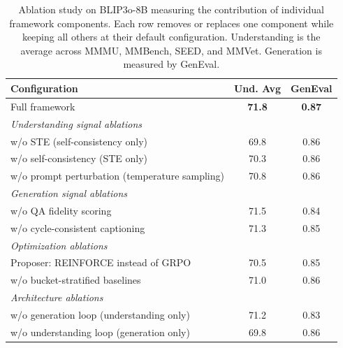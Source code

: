 \begin{table}[!htb]
  \caption{Ablation study on BLIP3o-8B measuring the contribution of individual framework components. Each row removes or replaces one component while keeping all others at their default configuration. Understanding is the average across MMMU, MMBench, SEED, and MMVet. Generation is measured by GenEval.}
  \label{tab:ablation}
  \centering
  \small
  \begin{tabular}{lcc}
    \toprule
    Configuration & Und. Avg & GenEval \\
    \midrule
    Full framework & \textbf{71.8} & \textbf{0.87} \\
    \midrule
    \multicolumn{3}{l}{\emph{Understanding signal ablations}} \\
    \quad w/o STE (self-consistency only) & 69.8 & 0.86 \\
    \quad w/o self-consistency (STE only) & 70.3 & 0.86 \\
    \quad w/o prompt perturbation (temperature sampling) & 70.8 & 0.86 \\
    \midrule
    \multicolumn{3}{l}{\emph{Generation signal ablations}} \\
    \quad w/o QA fidelity scoring & 71.5 & 0.84 \\
    \quad w/o cycle-consistent captioning & 71.3 & 0.85 \\
    \midrule
    \multicolumn{3}{l}{\emph{Optimization ablations}} \\
    \quad Proposer: REINFORCE instead of GRPO & 70.5 & 0.85 \\
    \quad w/o bucket-stratified baselines & 71.0 & 0.86 \\
    \midrule
    \multicolumn{3}{l}{\emph{Architecture ablations}} \\
    \quad w/o generation loop (understanding only) & 71.2 & 0.83 \\
    \quad w/o understanding loop (generation only) & 69.8 & 0.86 \\
    \bottomrule
  \end{tabular}
\end{table}
